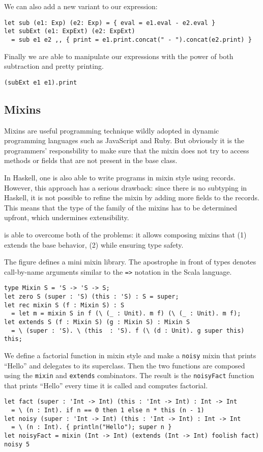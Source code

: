 We can also add a new variant to our expression:
\begin{lstlisting}
let sub (e1: Exp) (e2: Exp) = { eval = e1.eval - e2.eval }
let subExt (e1: ExpExt) (e2: ExpExt)
  = sub e1 e2 ,, { print = e1.print.concat(" - ").concat(e2.print) }
\end{lstlisting}

Finally we are able to manipulate our expressions with the power of both
subtraction and pretty printing.
\begin{lstlisting}
(subExt e1 e1).print
\end{lstlisting}

\subsection{Mixins}

Mixins are useful programming technique wildly adopted in dynamic programming
languages such as JavaScript and Ruby. But obviously it is the programmers'
responsbility to make sure that the mixin does not try to access methods or
fields that are not present in the base class.

In Haskell, one is also able to write programs in mixin style using records.
However, this approach has a serious drawback: since there is no subtyping in
Haskell, it is not possible to refine the mixin by adding more fields to the
records. This means that the type of the family of the mixins has to be
determined upfront, which undermines extensibility.

\name is able to overcome both of the problems: it allows composing mixins
that (1) extends the base behavior, (2) while ensuring type safety.

The figure defines a mini mixin library. The apostrophe in front of types
denotes call-by-name arguments similar to the \lstinline{=>} notation in the
Scala language.

\begin{lstlisting}
type Mixin S = 'S -> 'S -> S;
let zero S (super : 'S) (this : 'S) : S = super;
let rec mixin S (f : Mixin S) : S
  = let m = mixin S in f (\ (_ : Unit). m f) (\ (_ : Unit). m f);
let extends S (f : Mixin S) (g : Mixin S) : Mixin S
  = \ (super : 'S). \ (this  : 'S). f (\ (d : Unit). g super this) this;
\end{lstlisting}

We define a factorial function in mixin style and make a \lstinline{noisy} mixin
that prints ``Hello'' and delegates to its superclass. Then the two functions
are composed using the \lstinline{mixin} and \lstinline{extends} combinators.
The result is the \lstinline{noisyFact} function that prints ``Hello'' every
time it is called and computes factorial.
\begin{lstlisting}
let fact (super : 'Int -> Int) (this : 'Int -> Int) : Int -> Int
  = \ (n : Int). if n == 0 then 1 else n * this (n - 1)
let noisy (super : 'Int -> Int) (this : 'Int -> Int) : Int -> Int
  = \ (n : Int). { println("Hello"); super n }
let noisyFact = mixin (Int -> Int) (extends (Int -> Int) foolish fact)
noisy 5
\end{lstlisting}

